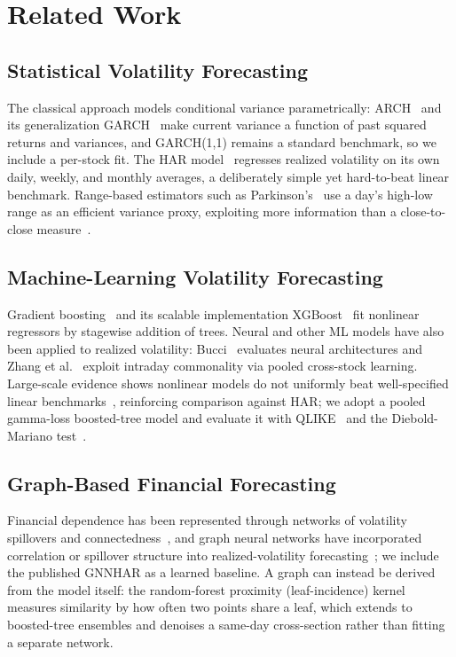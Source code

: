\documentclass[runningheads,a4paper]{llncs}
\begin{document}
\section{Related Work}

\subsection{Statistical Volatility Forecasting}
The classical approach models conditional variance parametrically: ARCH~\cite{engle1982} and its
generalization GARCH~\cite{bollerslev1986} make current variance a function of past squared returns and
variances, and GARCH(1,1) remains a standard benchmark, so we include a per-stock fit. The HAR
model~\cite{corsi2009} regresses realized volatility on its own daily, weekly, and monthly averages, a
deliberately simple yet hard-to-beat linear benchmark. Range-based estimators such as
Parkinson's~\cite{parkinson1980} use a day's high-low range as an efficient variance proxy, exploiting
more information than a close-to-close measure~\cite{alizadeh2002}.

\subsection{Machine-Learning Volatility Forecasting}
Gradient boosting~\cite{friedman2001} and its scalable implementation XGBoost~\cite{chen2016} fit
nonlinear regressors by stagewise addition of trees. Neural and other ML models have also been applied to
realized volatility: Bucci~\cite{bucci2020} evaluates neural architectures and Zhang et
al.~\cite{zhang2024ml} exploit intraday commonality via pooled cross-stock learning. Large-scale evidence
shows nonlinear models do not uniformly beat well-specified linear benchmarks~\cite{branco2024},
reinforcing comparison against HAR; we adopt a pooled gamma-loss boosted-tree model and evaluate it with
QLIKE~\cite{patton2011} and the Diebold-Mariano test~\cite{dm1995,hln1997}.

\subsection{Graph-Based Financial Forecasting}
Financial dependence has been represented through networks of volatility spillovers and connectedness~\cite{diebold2014},
and graph neural networks have incorporated correlation or spillover structure into realized-volatility
forecasting~\cite{gnnhar2024}; we include the published GNNHAR as a learned baseline. A graph can instead
be derived from the model itself: the random-forest proximity (leaf-incidence) kernel~\cite{rhodes2023}
measures similarity by how often two points share a leaf, which extends to boosted-tree ensembles and
denoises a same-day cross-section rather than fitting a separate network.
\end{document}
